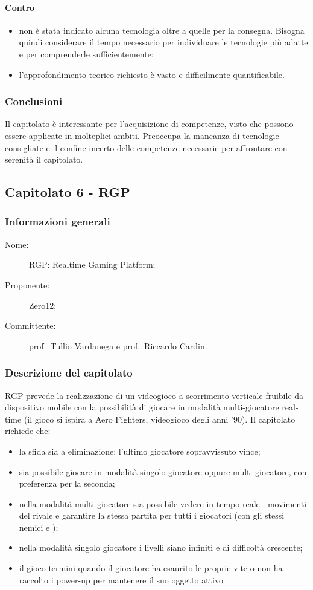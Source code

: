 \paragraph*{Contro}
\begin{itemize}
	\item non è stata indicato alcuna tecnologia oltre a quelle per la consegna. Bisogna quindi considerare il tempo necessario per individuare le tecnologie più adatte e per comprenderle sufficientemente;
	\item l'approfondimento teorico richiesto è vasto e difficilmente quantificabile.
\end{itemize}
\subsubsection{Conclusioni}
Il capitolato è interessante per l'acquisizione di competenze, visto che possono essere applicate in molteplici ambiti. Preoccupa la mancanza di tecnologie consigliate e il confine incerto delle competenze necessarie per affrontare con serenità il capitolato.

\subsection{Capitolato 6 - RGP}
\subsubsection{Informazioni generali}
\begin{description}
	\item[Nome:] RGP: Realtime Gaming Platform;
	\item[Proponente:] Zero12;
	\item[Committente:] prof.~Tullio Vardanega e prof.~Riccardo Cardin.
\end{description}
\subsubsection{Descrizione del capitolato}
RGP prevede la realizzazione di un videogioco a scorrimento verticale fruibile da dispositivo mobile con la possibilità di giocare in modalità multi-giocatore real-time (il gioco si ispira a Aero Fighters, videogioco degli anni '90). Il capitolato richiede che:
\begin{itemize}
	\item la sfida sia a eliminazione: l'ultimo giocatore sopravvissuto vince;
	\item sia possibile giocare in modalità singolo giocatore oppure multi-giocatore, con preferenza per la seconda; 
	\item nella modalità multi-giocatore sia possibile vedere in tempo reale i movimenti del rivale e garantire la stessa partita per tutti i giocatori (con gli stessi nemici e );
	\item nella modalità singolo giocatore i livelli siano infiniti e di difficoltà crescente;
	\item il gioco termini quando il giocatore ha esaurito le proprie vite o non ha raccolto i power-up per mantenere il suo oggetto attivo 
\end{itemize}
